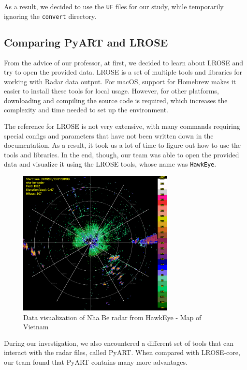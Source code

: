 As a result, we decided to use the \texttt{UF} files for our study, while temporarily ignoring the \texttt{convert} directory.


\subsection{Comparing PyART and LROSE}
From the advice of our professor, at first, we decided to learn about LROSE and try to open the provided data.
LROSE is a set of multiple tools and libraries for working with Radar data output.
For macOS, support for Homebrew makes it easier to install these tools for local usage.
However, for other platforms, downloading and compiling the source code is required,
which increases the complexity and time needed to set up the environment.

The reference for LROSE is not very extensive, with many commands requiring special configs and parameters that have not been written down
in the documentation. As a result, it took us a lot of time to figure out how to use the tools and libraries. In the end, though,
our team was able to open the provided data and visualize it using the LROSE tools, whose name was \texttt{HawkEye}.

\begin{figure}[H]
  \centering
  \includegraphics[width=0.7\textwidth]{Images/3.1-201905130120.DBZ-hawkeye.png}
  \vspace{2em}
  \caption{Data visualization of Nha Be radar from HawkEye - Map of Vietnam}
  \label{fig:hawkeye}
\end{figure}

During our investigation, we also encountered a different set of tools that can interact with the radar files, called PyART.
When compared with LROSE-core, our team found that PyART contains many more advantages.

